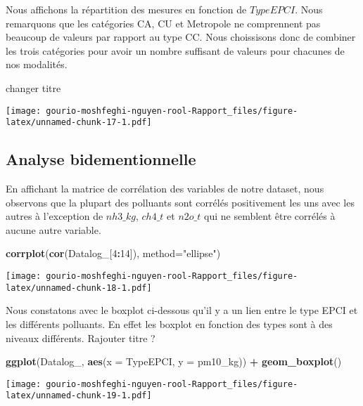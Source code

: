 \documentclass[
]{article}
\newenvironment{Shaded}{\begin{snugshade}}{\end{snugshade}}
\newcommand{\AttributeTok}[1]{\textcolor[rgb]{0.13,0.29,0.53}{#1}}
\newcommand{\DecValTok}[1]{\textcolor[rgb]{0.00,0.00,0.81}{#1}}
\newcommand{\FunctionTok}[1]{\textcolor[rgb]{0.13,0.29,0.53}{\textbf{#1}}}
\newcommand{\NormalTok}[1]{#1}
\newcommand{\SpecialCharTok}[1]{\textcolor[rgb]{0.81,0.36,0.00}{\textbf{#1}}}
\newcommand{\StringTok}[1]{\textcolor[rgb]{0.31,0.60,0.02}{#1}}
\begin{document}
Nous affichons la répartition des mesures en fonction de \(TypeEPCI\).
Nous remarquons que les catégories CA, CU et Metropole ne comprennent
pas beaucoup de valeurs par rapport au type CC. Nous choissisons donc de
combiner les trois catégories pour avoir un nombre suffisant de valeurs
pour chacunes de nos modalités.

changer titre

\texttt{[image: gourio-moshfeghi-nguyen-rool-Rapport\_files/figure-latex/unnamed-chunk-17-1.pdf]}

\hypertarget{analyse-bidementionnelle}{%
\subsection{Analyse bidementionnelle}\label{analyse-bidementionnelle}}

En affichant la matrice de corrélation des variables de notre dataset,
nous observons que la plupart des polluants sont corrélés positivement
les uns avec les autres à l'exception de \(nh3\_kg\), \(ch4\_t\) et
\(n2o\_t\) qui ne semblent être corrélés à aucune autre variable.

\begin{Shaded}
\begin{Highlighting}[]
\FunctionTok{corrplot}\NormalTok{(}\FunctionTok{cor}\NormalTok{(Datalog\_[}\DecValTok{4}\SpecialCharTok{:}\DecValTok{14}\NormalTok{]), }\AttributeTok{method=}\StringTok{"ellipse"}\NormalTok{)}
\end{Highlighting}
\end{Shaded}

\texttt{[image: gourio-moshfeghi-nguyen-rool-Rapport\_files/figure-latex/unnamed-chunk-18-1.pdf]}

Nous constatons avec le boxplot ci-dessous qu'il y a un lien entre le
type EPCI et les différents polluants. En effet les boxplot en fonction
des types sont à des niveaux différents. Rajouter titre ?

\begin{Shaded}
\begin{Highlighting}[]
\FunctionTok{ggplot}\NormalTok{(Datalog\_, }\FunctionTok{aes}\NormalTok{(}\AttributeTok{x =}\NormalTok{ TypeEPCI, }\AttributeTok{y =}\NormalTok{ pm10\_kg)) }\SpecialCharTok{+} \FunctionTok{geom\_boxplot}\NormalTok{()}
\end{Highlighting}
\end{Shaded}

\texttt{[image: gourio-moshfeghi-nguyen-rool-Rapport\_files/figure-latex/unnamed-chunk-19-1.pdf]}
\end{document}

